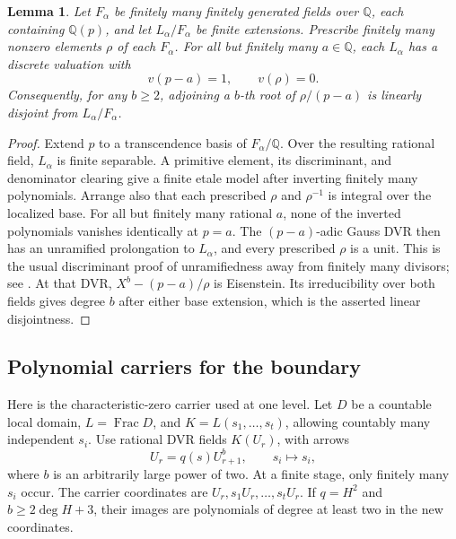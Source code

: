 \documentclass[11pt,reqno]{amsart}
\numberwithin{equation}{section}
\theoremstyle{plain}
\newtheorem{lemma}[theorem]{Lemma}
\theoremstyle{definition}
\theoremstyle{remark}
\begin{document}
\begin{lemma}\label{lem:ordinary-scalar-lock}
Let \(F_\alpha\) be finitely many finitely generated fields over
\(\mathbb Q\), each containing \(\mathbb Q(p)\), and let
\(L_\alpha/F_\alpha\) be finite extensions. Prescribe finitely many
nonzero elements \(\rho\) of each \(F_\alpha\).
For all but finitely many \(a\in\mathbb Q\), each \(L_\alpha\) has
a discrete valuation with
\[
 v(p-a)=1,\qquad v(\rho)=0.
\]
Consequently, for any \(b\ge2\), adjoining a \(b\)-th root of
\(\rho/(p-a)\) is linearly disjoint from \(L_\alpha/F_\alpha\).
\end{lemma}
\begin{proof}
Extend \(p\) to a transcendence basis of \(F_\alpha/\mathbb Q\).
Over the resulting rational field, \(L_\alpha\) is finite separable.
A primitive element, its discriminant, and denominator clearing give
a finite etale model after inverting finitely many polynomials.
Arrange also that each prescribed \(\rho\) and \(\rho^{-1}\) is
integral over the localized base. For all but finitely many rational
\(a\), none of the inverted polynomials vanishes identically at
\(p=a\). The \((p-a)\)-adic Gauss DVR then has an unramified
prolongation to \(L_\alpha\), and every prescribed \(\rho\) is a unit.
This is the usual discriminant proof of unramifiedness away from
finitely many divisors; see \cite{BourbakiCA}.
At that DVR, \(X^b-(p-a)/\rho\) is Eisenstein. Its irreducibility
over both fields gives degree \(b\) after either base extension,
which is the asserted linear disjointness.
\end{proof}

\subsection{Polynomial carriers for the boundary}

Here is the characteristic-zero carrier used at one level. Let \(D\)
be a countable local domain, \(L=\operatorname{Frac}D\), and
\(K=L(s_1,\ldots,s_t)\), allowing countably many independent \(s_i\).
Use rational DVR fields \(K(U_r)\), with arrows
\begin{equation}\label{eq:ordinary-boundary-arrow}
 U_r=q(s)U_{r+1}^{b},\qquad s_i\longmapsto s_i,
\end{equation}
where \(b\) is an arbitrarily large power of two. At a finite stage,
only finitely many \(s_i\) occur. The carrier coordinates are
\(U_r,s_1U_r,\ldots,s_tU_r\). If \(q=H^2\) and
\(b\ge2\deg H+3\), their images are polynomials of degree at least
two in the new coordinates.
\end{document}
